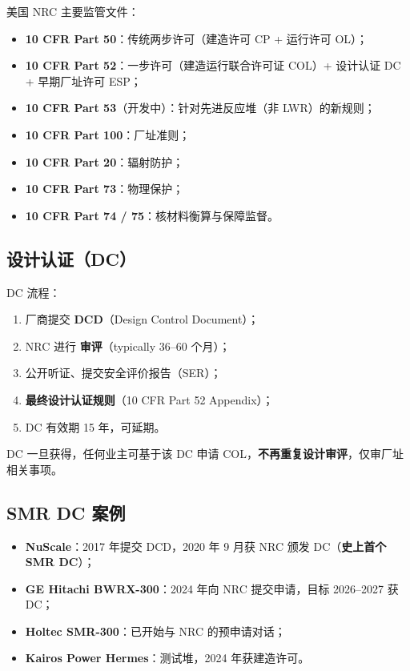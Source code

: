 \documentclass[
  UTF8,
  scheme=plain,
  fontsize=10pt,
  openany
]{ctexbook}
\begin{document}
美国 NRC 主要监管文件：

\begin{itemize}
\tightlist
\item
  \textbf{10 CFR Part 50}：传统两步许可（建造许可 CP + 运行许可 OL）；
\item
  \textbf{10 CFR Part 52}：一步许可（建造运行联合许可证 COL）+ 设计认证
  DC + 早期厂址许可 ESP；
\item
  \textbf{10 CFR Part 53}（开发中）：针对先进反应堆（非 LWR）的新规则；
\item
  \textbf{10 CFR Part 100}：厂址准则；
\item
  \textbf{10 CFR Part 20}：辐射防护；
\item
  \textbf{10 CFR Part 73}：物理保护；
\item
  \textbf{10 CFR Part 74 / 75}：核材料衡算与保障监督。
\end{itemize}

\subsection{设计认证（DC）}\label{ux8bbeux8ba1ux8ba4ux8bc1dc}

DC 流程：

\begin{enumerate}
\def\labelenumi{\arabic{enumi}.}
\tightlist
\item
  厂商提交 \textbf{DCD}（Design Control Document）；
\item
  NRC 进行 \textbf{审评}（typically 36--60 个月）；
\item
  公开听证、提交安全评价报告（SER）；
\item
  \textbf{最终设计认证规则}（10 CFR Part 52 Appendix）；
\item
  DC 有效期 15 年，可延期。
\end{enumerate}

DC 一旦获得，任何业主可基于该 DC 申请
COL，\textbf{不再重复设计审评}，仅审厂址相关事项。

\subsection{SMR DC 案例}\label{smr-dc-ux6848ux4f8b}

\begin{itemize}
\tightlist
\item
  \textbf{NuScale}：2017 年提交 DCD，2020 年 9 月获 NRC 颁发
  DC（\textbf{史上首个 SMR DC}）；
\item
  \textbf{GE Hitachi BWRX-300}：2024 年向 NRC 提交申请，目标 2026--2027
  获 DC；
\item
  \textbf{Holtec SMR-300}：已开始与 NRC 的预申请对话；
\item
  \textbf{Kairos Power Hermes}：测试堆，2024 年获建造许可。
\end{itemize}
\end{document}
